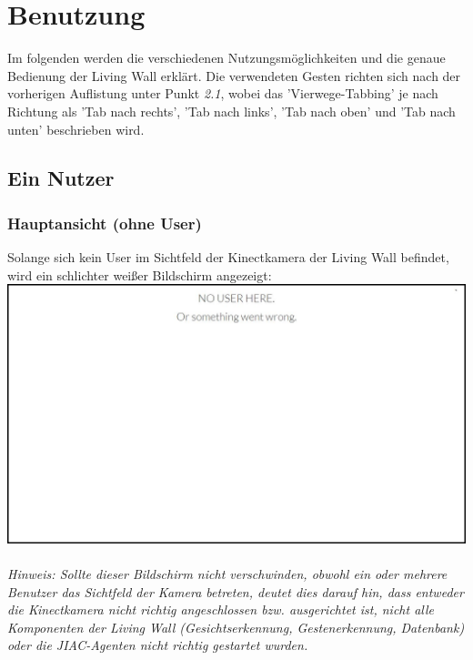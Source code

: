 \documentclass[10pt,a4paper]{report}
\begin{document}
	\section{Benutzung}
	Im folgenden werden die verschiedenen Nutzungsmöglichkeiten und die genaue Bedienung der Living Wall erklärt. Die verwendeten Gesten richten sich nach der vorherigen Auflistung unter Punkt \textit{2.1}, wobei das 'Vierwege-Tabbing' je nach Richtung als 'Tab nach rechts', 'Tab nach links', 'Tab nach oben' und 'Tab nach unten' beschrieben wird.
		\subsection{Ein Nutzer}
		\subsubsection{Hauptansicht (ohne User)}
		Solange sich kein User im Sichtfeld der Kinectkamera der Living Wall befindet, wird ein schlichter weißer Bildschirm angezeigt: \\
		\includegraphics[scale=0.31]{NoUser}\\\\
		\textit{Hinweis: Sollte dieser Bildschirm nicht verschwinden, obwohl ein oder mehrere Benutzer das Sichtfeld der Kamera betreten, deutet dies darauf hin, dass entweder die Kinectkamera nicht richtig angeschlossen bzw. ausgerichtet ist, nicht alle Komponenten der Living Wall (Gesichtserkennung, Gestenerkennung, Datenbank) oder die JIAC-Agenten nicht richtig gestartet wurden.}
\end{document}
